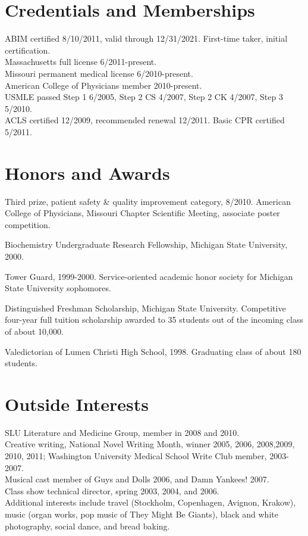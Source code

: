 \documentclass[12pt]{article}
\begin{document}
\section{Credentials and Memberships}

ABIM certified 8/10/2011, valid through 12/31/2021. First-time taker,
initial certification.\\
Massachusetts full license 6/2011-present.\\
Missouri permanent medical license 6/2010-present.\\
American College of Physicians member 2010-present.\\
USMLE passed Step 1 6/2005, Step 2 CS 4/2007, Step 2 CK 4/2007, Step 3
5/2010.\\
ACLS certified 12/2009, recommended renewal 12/2011. Basic CPR
certified 5/2011.\\

\section{Honors and Awards}

Third prize, patient safety \& quality improvement category, 8/2010.
American College of Physicians, Missouri Chapter Scientific Meeting,
associate poster competition.

Biochemistry Undergraduate Research Fellowship, Michigan State
University, 2000.

Tower Guard, 1999-2000. Service-oriented academic honor society for
Michigan State University sophomores.

Distinguished Freshman Scholarship, Michigan State University.
Competitive four-year full tuition scholarship awarded to 35 students
out of the incoming class of about 10,000.

Valedictorian of Lumen Christi High School, 1998. Graduating class of
about 180 students.

\section{Outside Interests}

SLU Literature and Medicine Group, member in 2008 and 2010.\\
Creative writing, National Novel Writing Month, winner 2005, 2006,
2008,2009, 2010, 2011; Washington University Medical School Write Club
member, 2003-2007.\\
Musical cast member of Guys and Dolls 2006, and Damn Yankees! 2007.\\
Class show technical director, spring 2003, 2004, and 2006.\\
Additional interests include travel (Stockholm, Copenhagen, Avignon,
Krakow), music (organ works, pop music of They Might Be Giants), black
and white photography, social dance, and bread baking.
\end{document}
